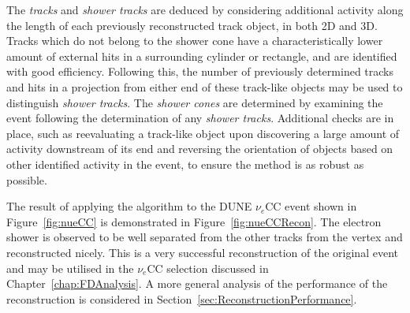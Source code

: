 The \textit{tracks} and \textit{shower tracks} are deduced by considering additional activity along the length of each previously reconstructed track object, in both 2D and 3D.  Tracks which do not belong to the shower cone have a characteristically lower amount of external hits in a surrounding cylinder or rectangle, and are identified with good efficiency.  Following this, the number of previously determined tracks and hits in a projection from either end of these track-like objects may be used to distinguish \textit{shower tracks}.  The \textit{shower cones} are determined by examining the event following the determination of any \textit{shower tracks}.  Additional checks are in place, such as reevaluating a track-like object upon discovering a large amount of activity downstream of its end and reversing the orientation of objects based on other identified activity in the event, to ensure the method is as robust as possible.

The result of applying the algorithm to the DUNE $\nu_e$CC event shown in Figure~\ref{fig:nueCC} is demonstrated in Figure~\ref{fig:nueCCRecon}.  The electron shower is observed to be well separated from the other tracks from the vertex and reconstructed nicely.  This is a very successful reconstruction of the original event and may be utilised in the $\nu_e$CC selection discussed in Chapter~\ref{chap:FDAnalysis}.  A more general analysis of the performance of the reconstruction is considered in Section~\ref{sec:ReconstructionPerformance}.

